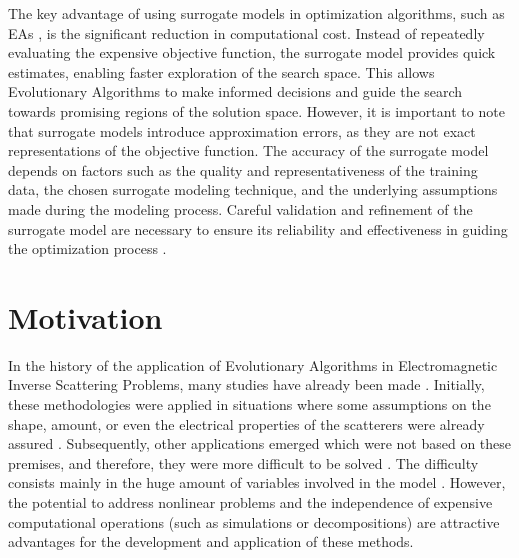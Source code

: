 	The key advantage of using surrogate models in optimization algorithms, such as EAs \citep{valadao2020comparative}, is the significant reduction in computational cost. Instead of repeatedly evaluating the expensive objective function, the surrogate model provides quick estimates, enabling faster exploration of the search space. This allows Evolutionary Algorithms to make informed decisions and guide the search towards promising regions of the solution space. However, it is important to note that surrogate models introduce approximation errors, as they are not exact representations of the objective function. The accuracy of the surrogate model depends on factors such as the quality and representativeness of the training data, the chosen surrogate modeling technique, and the underlying assumptions made during the modeling process. Careful validation and refinement of the surrogate model are necessary to ensure its reliability and effectiveness in guiding the optimization process \citep{he2023review,haftka2016parallel}.
	
	
	\section{Motivation}\label{chap:introduction:motivation}
	
		In the history of the application of Evolutionary Algorithms in Electromagnetic Inverse Scattering Problems, many studies have already been made \citep{rocca2009evolutionary}. Initially, these methodologies were applied in situations where some assumptions on the shape, amount, or even the electrical properties of the scatterers were already assured \citep{michalski2000electromagnetic,kent1997dielectric}. Subsequently, other applications emerged which were not based on these premises, and therefore, they were more difficult to be solved \citep{chiu1996image,huang2008time}. The difficulty consists mainly in the huge amount of variables involved in the model \citep{caorsi2000two,donelli2006integrated,salucci2017multifrequency}. However, the potential to address nonlinear problems and the independence of expensive computational operations (such as simulations or decompositions) are attractive advantages for the development and application of these methods.
	
